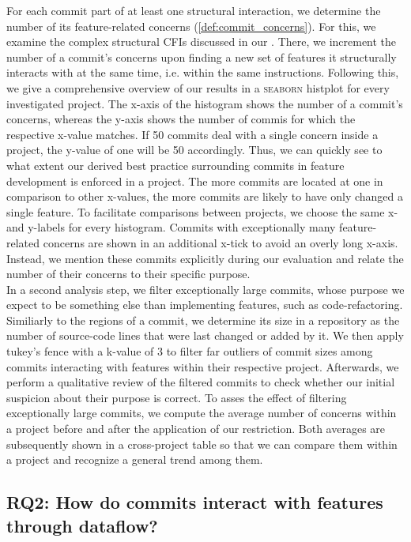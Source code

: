 For each commit part of at least one structural interaction, we determine the number of its feature-related concerns (\ref{def:commit_concerns}).
For this, we examine the complex structural CFIs discussed in our .
There, we increment the number of a commit's concerns upon finding a new set of features it structurally interacts with at the same time, i.e. within the same instructions.
Following this, we give a comprehensive overview of our results in a \textsc{seaborn} histplot for every investigated project.
The x-axis of the histogram shows the number of a commit's concerns, whereas the y-axis shows the number of commis for which the respective x-value matches.
If 50 commits deal with a single concern inside a project, the y-value of one will be 50 accordingly.
Thus, we can quickly see to what extent our derived best practice surrounding commits in feature development is enforced in a project.
The more commits are located at one in comparison to other x-values, the more commits are likely to have only changed a single feature.
To facilitate comparisons between projects, we choose the same x- and y-labels for every histogram. 
Commits with exceptionally many feature-related concerns are shown in an additional x-tick to avoid an overly long x-axis.
Instead, we mention these commits explicitly during our evaluation and relate the number of their concerns to their specific purpose. \\
In a second analysis step, we filter exceptionally large commits, whose purpose we expect to be something else than implementing features, such as code-refactoring.
Similiarly to the regions of a commit, we determine its size in a repository as the number of source-code lines that were last changed or added by it.
We then apply tukey's fence with a k-value of 3 to filter far outliers of commit sizes among commits interacting with features within their respective project.
Afterwards, we perform a qualitative review of the filtered commits to check whether our initial suspicion about their purpose is correct.
To asses the effect of filtering exceptionally large commits, we compute the average number of concerns within a project before and after the application of our restriction.
Both averages are subsequently shown in a cross-project table so that we can compare them within a project and recognize a general trend among them.

\subsection*{\textbf{RQ2: How do commits interact with features through dataflow?}}

